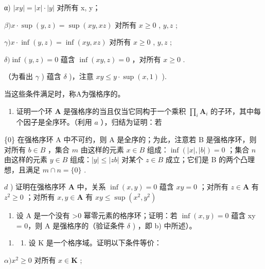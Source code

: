 α) \(|xy| = |x| \cdot |y|\) 对所有 x, y；

\(\beta) x \cdot \sup(y, z) = \sup(xy, xz)\) 对所有 \(x \geqslant 0\) , \(y, z\) ;

\(\gamma) x \cdot \inf(y, z) = \inf(xy, xz)\) 对所有 \(x \geqslant 0\) , \(y, z\) ;

\(\delta)\inf (y,z) = 0\) 蕴含 \(\inf (xy,z) = 0\) ，对所有 \(x\geqslant 0\) .

（为看出 \(\gamma\) ) 蕴含 \(\delta\) )，注意 \(xy \leqslant y \cdot \sup (x, 1)\) ).

当这些条件满足时，称A为强格序的。

\begin{enumerate}
\def\labelenumi{\alph{enumi})}
\setcounter{enumi}{2}
\tightlist
\item
  证明一个环 \(\mathbf{A}\) 是强格序的当且仅当它同构于一个乘积 \(\prod_{i} \mathbf{A}_{i}\) 的子环，其中每个因子是全序环。（利用 \(a\) ），归结为证明：若
\end{enumerate}

\{0\} 在强格序环 A 中不可约，则 A 是全序的；为此，注意若 B 是强格序环，则对所有 \(b \in B\) ，集合 \(m\) 由这样的元素 \(x \in B\) 组成：\(\inf(|x|, |b|) = 0\) ；集合 \(n\) 由这样的元素 \(y \in B\) 组成：\(|y| \leqslant |zb|\) 对某个 \(z \in B\) 成立；它们是 B 的两个凸理想，且满足 \(m \cap n = \{0\}\) .

\(d\) ) 证明在强格序环 \(\mathbf{A}\) 中，关系 \(\inf (x,y) = 0\) 蕴含 \(xy = 0\) ；对所有 \(z\in \mathbf{A}\) 有 \(z^2\geqslant 0\) ；对所有 \(x,y\in \mathbf{A}\) 有 \(xy\leqslant \sup (x^2,y^2)\)

\begin{enumerate}
\def\labelenumi{\alph{enumi})}
\setcounter{enumi}{4}
\tightlist
\item
  设 A 是一个没有 \textgreater0 幂零元素的格序环；证明：若 \(\inf(x, y) = 0\) 蕴含 xy = 0，则 A 是强格序的（验证条件 \(\delta\) ) ，即 b) 中所述）。
\end{enumerate}

\begin{enumerate}
\def\labelenumi{\arabic{enumi})}
\setcounter{enumi}{5}
\tightlist
\item
  \begin{enumerate}
  \def\labelenumii{\alph{enumii})}
  \tightlist
  \item
    设 K 是一个格序域。证明以下条件等价：
  \end{enumerate}
\end{enumerate}

\(\alpha) x^{2} \geqslant 0\) 对所有 \(x \in \mathbf{K}\) ;

